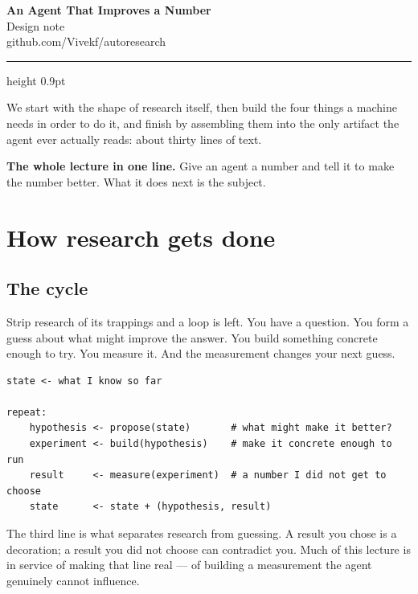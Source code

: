 \documentclass[11pt]{article}
\newcommand{\keyidea}[1]{\begin{idea}#1\end{idea}}
\begin{document}
\begin{center}
{\LARGE\bfseries\color{mitred} An Agent That Improves a Number}\\[0.4em]
{\large\color{mitred} Design note}\\[0.6em]
{\small\color{midgrey} github.com/Vivekf/autoresearch}
\end{center}

\vspace{0.5em}\hrule height 0.9pt\vspace{1.2em}

\noindent
We start with the shape of research itself, then build the four things a machine needs in order
to do it, and finish by assembling them into the only artifact the agent ever actually reads:
about thirty lines of text.

\keyidea{\textbf{The whole lecture in one line.} Give an agent a number and tell it to make the
number better. What it does next is the subject.}

\section{How research gets done}

\subsection{The cycle}

Strip research of its trappings and a loop is left. You have a question. You form a guess about
what might improve the answer. You build something concrete enough to try. You measure it. And
the measurement changes your next guess.

\begin{lstlisting}[language=pseudo]
state <- what I know so far

repeat:
    hypothesis <- propose(state)       # what might make it better?
    experiment <- build(hypothesis)    # make it concrete enough to run
    result     <- measure(experiment)  # a number I did not get to choose
    state      <- state + (hypothesis, result)
\end{lstlisting}

The third line is what separates research from guessing. A result you chose is a decoration; a
result you did not choose can contradict you. Much of this lecture is in service of making that
line real --- of building a measurement the agent genuinely cannot influence.
\end{document}
